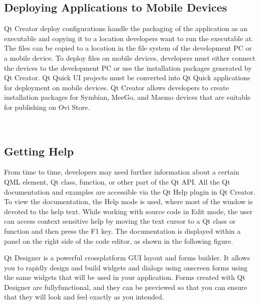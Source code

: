 \subsection{Deploying Applications to Mobile Devices}

Qt Creator deploy configurations handle the packaging of the application as an executable and copying it
to  a  location  developers  want  to  run  the  executable  at.  The  files  can  be  copied  to  a  location  in  the  file
system  of  the  development  PC  or  a  mobile  device.  To  deploy  files  on  mobile devices, developers must
either  connect  the  devices  to  the  development  PC  or  use  the  installation  packages  generated  by  Qt
Creator.  Qt  Quick  UI  projects  must  be  converted into Qt Quick applications for deployment on mobile devices.
Qt  Creator  allows developers to  create installation packages for Symbian, MeeGo, and Maemo devices
that are suitable for publishing on Ovi Store.


\
\
\


\subsection{Getting Help}

From  time  to  time,  developers  may  need  further  information  about  a  certain  QML  element,  Qt  class,
function,  or  other  part  of  the  Qt  API.  All   the  Qt  documentation  and  examples are accessible via the Qt
Help plugin in Qt Creator.
To  view  the  documentation,   the  Help  mode  is  used,  where  most  of  the  window  is  devoted  to  the  help
text.  While working with source code in Edit mode, the user can access context sensitive help by moving
the  text  cursor  to  a  Qt  class  or   function  and  then  press  the  F1  key.  The  documentation  is  displayed
within a panel on the right side of the code editor, as shown in the following figure.

Qt  Designer  is  a  powerful cross­platform GUI layout and forms builder. It allows you to rapidly design
and  build  widgets  and  dialogs  using  on­screen  forms  using  the  same  widgets  that  will  be  used  in  your
application.  Forms  created  with  Qt  Designer  are fully­functional, and they can be previewed so that you
can ensure that they will look and feel exactly as you intended.\\


